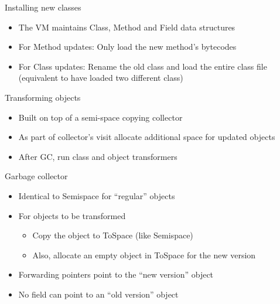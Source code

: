 \begin{frame}[t,fragile,label=classload]{Installing new classes}%
\begin{itemize}
\item The VM maintains Class, Method and Field data structures
\item For Method updates: Only load the new method's bytecodes
\item For Class updates: Rename the old class and load the entire class
file (equivalent to have loaded two different class)
\end{itemize}
\end{frame}

\begin{frame}[t,fragile,label=transform]{Transforming objects}%
\begin{itemize}
\item Built on top of a semi-space copying collector
\item As part of collector's visit allocate additional space for updated
      objects
\item After GC, run class and object transformers
\end{itemize}
\end{frame}

\ifdraft{}{


}

\begin{frame}[t,fragile]{\DSU{} Garbage collector}%
\begin{itemize}
\item Identical to Semispace for ``regular'' objects
\item For objects to be transformed
  \begin{itemize}
  \item Copy the object to ToSpace (like Semispace)
  \item Also, allocate an empty object in ToSpace for the new version
  \end{itemize}
\item Forwarding pointers point to the ``new version'' object
\item No field can point to an ``old version'' object
\end{itemize}
\end{frame}

\ifdraft{}{



}

